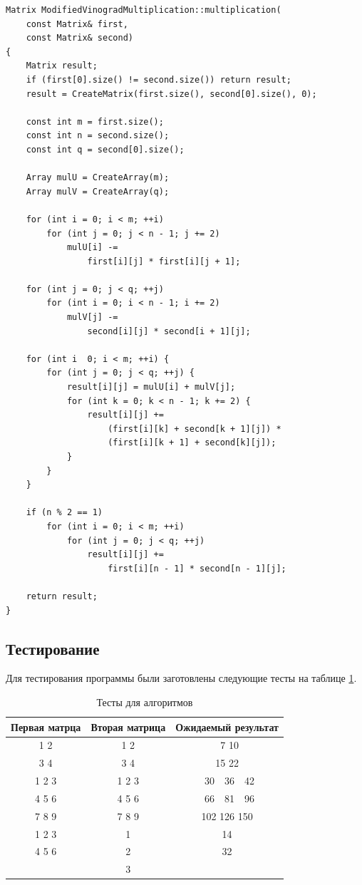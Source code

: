 \documentclass[a4paper,12pt]{article}
\begin{document}
\begin{lstlisting}[caption=Оптимизированный алгоритм Винограда умножения матриц,label=list:modvin]
Matrix ModifiedVinogradMultiplication::multiplication(
    const Matrix& first,
    const Matrix& second)
{
    Matrix result;
    if (first[0].size() != second.size()) return result;
    result = CreateMatrix(first.size(), second[0].size(), 0);

    const int m = first.size();
    const int n = second.size();
    const int q = second[0].size();

    Array mulU = CreateArray(m);
    Array mulV = CreateArray(q);

    for (int i = 0; i < m; ++i)
        for (int j = 0; j < n - 1; j += 2)
            mulU[i] -=
                first[i][j] * first[i][j + 1];

    for (int j = 0; j < q; ++j)
        for (int i = 0; i < n - 1; i += 2)
            mulV[j] -=
                second[i][j] * second[i + 1][j];

    for (int i  0; i < m; ++i) {
        for (int j = 0; j < q; ++j) {
            result[i][j] = mulU[i] + mulV[j];
            for (int k = 0; k < n - 1; k += 2) {
                result[i][j] +=
                    (first[i][k] + second[k + 1][j]) *
                    (first[i][k + 1] + second[k][j]);
            }
        }
    }

    if (n % 2 == 1)
        for (int i = 0; i < m; ++i)
            for (int j = 0; j < q; ++j)
                result[i][j] +=
                    first[i][n - 1] * second[n - 1][j];

    return result;
}
\end{lstlisting}

\subsection{Тестирование}

Для тестирования программы были заготовлены следующие тесты на таблице
\ref{table:test}.

\begin{table}[H]
    \caption{Тесты для алгоритмов}
    \label{table:test}
    \centering
    \begin{tabular}{|c|c|c|}
        \hline
        Первая матрца & Вторая матрица & Ожидаемый результат \\
        \hline
        1 2 & 1 2 & \ 7 10 \\
        3 4 & 3 4 & 15 22 \\
        \hline
        1 2 3 & 1 2 3 & \ 30\ \ 36\ \ 42 \\
        4 5 6 & 4 5 6 & \ 66\ \ 81\ \ 96 \\
        7 8 9 & 7 8 9 & 102 126 150 \\
        \hline
        1 2 3 & 1 & 14 \\
        4 5 6 & 2 & 32 \\
              & 3 & \\
        \hline
    \end{tabular}
\end{table}
\end{document}
